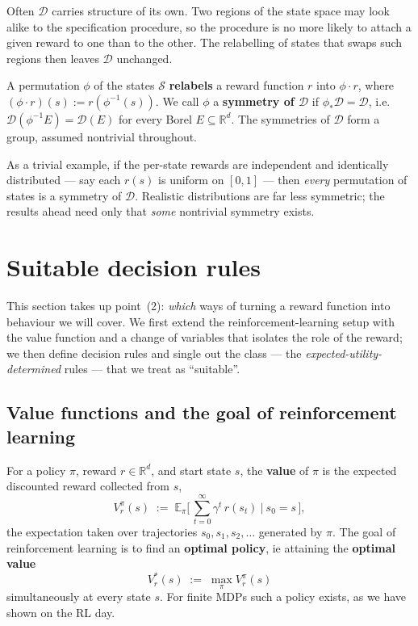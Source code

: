 \documentclass[11pt]{article}
\newcommand{\cS}{\mathcal{S}}
\newcommand{\R}{\mathbb{R}}
\newcommand{\E}{\mathbb{E}}
\newcommand{\Dist}{\mathcal{D}}    %
\begin{document}
Often $\Dist$ carries structure of its own. Two regions of the state space may look alike to the
specification procedure, so the
procedure is no more likely to attach a given reward to one than to the other. The relabelling of
states that swaps such regions then leaves $\Dist$ unchanged.

\begin{definition}[Symmetry of $\Dist$]\label{def:D_symmetry}
A permutation $\phi$ of the states $\cS$ \textbf{relabels} a reward function $r$ into $\phi\cdot r$,
where $(\phi\cdot r)(s) := r(\phi^{-1}(s))$. We call $\phi$ a \textbf{symmetry of $\Dist$} if $\phi_*\Dist = \Dist$, i.e.\
$\Dist(\phi^{-1}E) = \Dist(E)$ for every Borel $E\subseteq\R^d$. The symmetries of $\Dist$ form a
group, assumed nontrivial throughout.
\end{definition}

As a trivial example, if the per-state rewards are independent and identically distributed --- say
each $r(s)$ is uniform on $[0,1]$ --- then \emph{every} permutation of states is a symmetry of
$\Dist$. Realistic distributions are far less symmetric; the results ahead need only that
\emph{some} nontrivial symmetry exists.



\section{Suitable decision rules}\label{prob:decision_rules}

This section takes up point~(2): \emph{which} ways of turning a reward function into
behaviour we will cover. We first extend the reinforcement-learning setup with the value
function and a change of variables that isolates the role of the reward; we then define
decision rules and single out the class --- the \emph{expected-utility-determined} rules
--- that we treat as ``suitable''.

\subsection*{Value functions and the goal of reinforcement learning}


\begin{definition}\label{def:value}
For a policy $\pi$, reward $r\in\R^d$, and start state $s$, the \textbf{value} of $\pi$ is
the expected discounted reward collected from $s$,
$$
V^\pi_r(s) \;:=\; \E_\pi\!\Big[\,\textstyle\sum_{t=0}^{\infty} \gamma^t\, r(s_t)\ \Big|\ s_0 = s\,\Big],
$$
the expectation taken over trajectories $s_0, s_1, s_2, \dots$ generated by $\pi$. The goal of reinforcement learning is to find an \textbf{optimal policy}, ie attaining the \textbf{optimal value}
$$
V^\ast_r(s) \;:=\; \max_\pi V^\pi_r(s)
$$
simultaneously at every state $s$. For finite MDPs such a policy exists, as we have shown on the RL day.
\end{definition}
\end{document}
